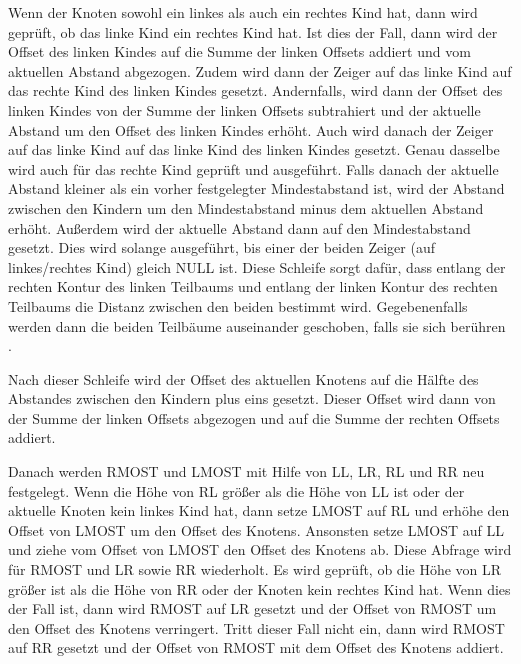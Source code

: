 Wenn der Knoten sowohl ein linkes als auch ein rechtes Kind hat, dann wird geprüft, ob das linke Kind ein rechtes Kind hat. 
Ist dies der Fall, dann wird der Offset des linken Kindes auf die Summe der linken Offsets addiert und vom aktuellen Abstand abgezogen. 
Zudem wird dann der Zeiger auf das linke Kind auf das rechte Kind des linken Kindes gesetzt. Andernfalls, wird dann der Offset des linken 
Kindes von der Summe der linken Offsets subtrahiert und der aktuelle Abstand um den Offset des linken Kindes erhöht. Auch wird danach der 
Zeiger auf das linke Kind auf das linke Kind des linken Kindes gesetzt. Genau dasselbe wird auch für das rechte Kind geprüft und ausgeführt. 
Falls danach der aktuelle Abstand kleiner als ein vorher festgelegter Mindestabstand ist, wird der Abstand zwischen den Kindern um den 
Mindestabstand minus dem aktuellen Abstand erhöht. Außerdem wird der aktuelle Abstand dann auf den Mindestabstand gesetzt. Dies wird solange 
ausgeführt, bis einer der beiden Zeiger (auf linkes/rechtes Kind) gleich NULL ist. Diese Schleife sorgt dafür, dass entlang der rechten 
Kontur des linken Teilbaums und entlang der linken Kontur des rechten Teilbaums die Distanz zwischen den beiden bestimmt wird. 
Gegebenenfalls werden dann die beiden Teilbäume auseinander geschoben, falls sie sich berühren \cite{q2}.

Nach dieser Schleife wird der Offset des aktuellen Knotens auf die Hälfte des Abstandes zwischen den Kindern plus eins gesetzt. 
Dieser Offset wird dann von der Summe der linken Offsets abgezogen und auf die Summe der rechten Offsets addiert. 

Danach werden RMOST und LMOST mit Hilfe von \ac{LL}, \ac{LR}, \ac{RL} und \ac{RR} neu festgelegt. Wenn die Höhe von \ac{RL} größer als die Höhe von \ac{LL} ist oder 
der aktuelle Knoten kein linkes Kind hat, dann setze LMOST auf \ac{RL} und erhöhe den Offset von LMOST um den Offset des Knotens. 
Ansonsten setze LMOST auf \ac{LL} und ziehe vom Offset von LMOST den Offset des Knotens ab. Diese Abfrage wird für RMOST und \ac{LR} sowie \ac{RR} 
wiederholt. Es wird geprüft, ob die Höhe von \ac{LR} größer ist als die Höhe von \ac{RR} oder der Knoten kein rechtes Kind hat. Wenn dies der Fall ist, 
dann wird RMOST auf \ac{LR} gesetzt und der Offset von RMOST um den Offset des Knotens verringert. Tritt dieser Fall nicht ein, dann wird RMOST 
auf \ac{RR} gesetzt und der Offset von RMOST mit dem Offset des Knotens addiert. 

